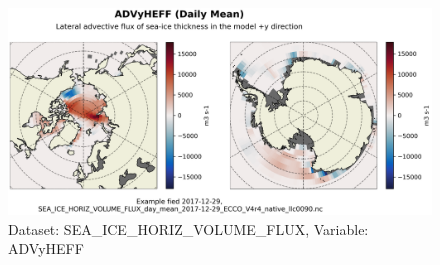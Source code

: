 \begin{figure}[H]
\centering
\includegraphics[scale=0.55]{../images/plots/native_plots/Sea-Ice_and_Snow_Horizontal_Volume_Fluxes/ADVyHEFF.png}
\caption{Dataset: SEA\_ICE\_HORIZ\_VOLUME\_FLUX, Variable: ADVyHEFF}
\label{tab:table-SEA_ICE_HORIZ_VOLUME_FLUX_ADVyHEFF-Plot}
\end{figure}
\pagebreak
